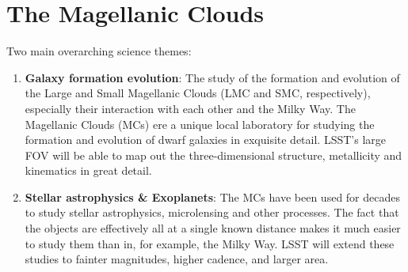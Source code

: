 %
%
%
%
%
%

\section{ The Magellanic Clouds }
\label{sec:keyword} %




Two main overarching science themes:
\begin{enumerate}
\item {\bf Galaxy formation evolution}: The study of the formation and evolution of the Large and Small
  Magellanic Clouds (LMC and SMC, respectively), especially their interaction with each other and the Milky Way.
  The Magellanic Clouds (MCs) ere a unique local laboratory for studying the formation and evolution of
  dwarf galaxies in exquisite detail.  LSST's large FOV will be able to map out the three-dimensional
  structure, metallicity and kinematics in great detail.
\item {\bf Stellar astrophysics \& Exoplanets}:  The MCs have been used for decades to study stellar
  astrophysics, microlensing and other processes.  The fact that the objects are effectively all at a single
  known distance makes it much easier to study them than in, for example, the Milky Way.  LSST will extend
  these studies to fainter magnitudes, higher cadence, and larger area.
\end{enumerate}

